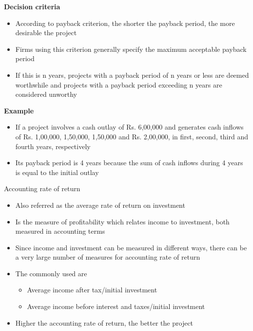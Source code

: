 \documentclass[12pt,ignorenonframetext,aspectratio=169]{beamer}
\providecommand{\tightlist}{%
  \setlength{\itemsep}{0pt}\setlength{\parskip}{0pt}}
\begin{document}
\begin{frame}{}
\protect\hypertarget{section-7}{}
\textbf{Decision criteria}

\begin{itemize}
\tightlist
\item
  According to payback criterion, the shorter the payback period, the
  more desirable the project
\item
  Firms using this criterion generally specify the maximum acceptable
  payback period
\item
  If this is n years, projects with a payback period of n years or less
  are deemed worthwhile and projects with a payback period exceeding n
  years are considered unworthy
\end{itemize}

\textbf{Example}

\begin{itemize}
\tightlist
\item
  If a project involves a cash outlay of Rs. 6,00,000 and generates cash
  inflows of Rs. 1,00,000, 1,50,000, 1,50,000 and Rs. 2,00,000, in
  first, second, third and fourth years, respectively
\item
  Its payback period is 4 years because the sum of cash inflows during 4
  years is equal to the initial outlay
\end{itemize}
\end{frame}

\begin{frame}{Accounting rate of return}
\protect\hypertarget{accounting-rate-of-return}{}
\begin{itemize}
\tightlist
\item
  Also referred as the average rate of return on investment
\item
  Is the measure of profitability which relates income to investment,
  both measured in accounting terms
\item
  Since income and investment can be measured in different ways, there
  can be a very large number of measures for accounting rate of return
\item
  The commonly used are

  \begin{itemize}
  \tightlist
  \item
    Average income after tax/initial investment
  \item
    Average income before interest and taxes/initial investment
  \end{itemize}
\item
  Higher the accounting rate of return, the better the project
\end{itemize}
\end{frame}
\end{document}
